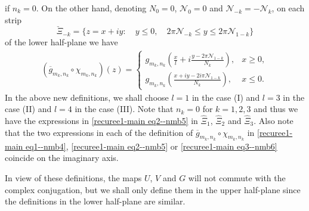 \documentclass[12pt]{amsart}
\numberwithin{equation}{section}
\begin{document}
if $n_k=0$. On the other hand, denoting $N_{0}=0$, $\mathcal{N}_{0}=0$ and $\mathcal{N}_{-k}=-\mathcal{N}_{k}$, on each strip
\begin{equation*}
\check{\Xi}_{-k}=\{z=x+iy: \quad y\leq 0, \quad 2\pi\mathcal{N}_{-k}\leq y\leq 2\pi \mathcal{N}_{1-k}\}
\end{equation*}
of the lower half-plane we have
\begin{equation}\label{recuree1-main eq3--nmb6}
\begin{split}
(\overline{g}_{m_k,n_k}\circ\chi_{m_k,n_k})(z)=\left\{
\begin{array}{ll}
g_{m_k,n_k}\left(\frac{x}{l}+i\frac{y-2\pi\mathcal{N}_{1-k}}{N_{k}}\right), & x\geq 0, \\
g_{m_k,n_k}\left(\frac{x+iy-2i\pi\mathcal{N}_{1-k}}{N_k}\right),          & x\leq 0.
\end{array}
\right.
\end{split}
\end{equation}
In the above new definitions, we shall choose $l=1$ in the case (I) and $l=3$ in the case (II) and $l=4$ in the case (III). Note that $n_k=0$ for $k=1,2,3$ and thus we have the expressions in \eqref{recuree1-main eq2--nmb5} in $\hat{\Xi}_1$, $\hat{\Xi}_2$ and $\hat{\Xi}_3$. Also note that the two expressions in each of the definition of $\overline{g}_{m_k,n_k}\circ\chi_{m_k,n_k}$ in \eqref{recuree1-main eq1--nmb4}, \eqref{recuree1-main eq2--nmb5} or \eqref{recuree1-main eq3--nmb6} coincide on the imaginary axis.

In view of these definitions, the maps $U$, $V$ and $G$ will not commute with the complex conjugation, but we shall only define them in the upper half-plane since the definitions in the lower half-plane are similar.
\end{document}
